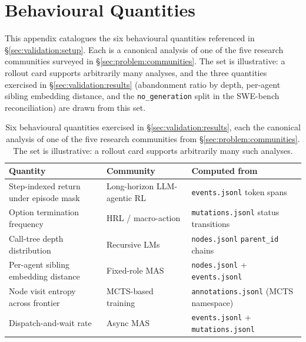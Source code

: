 \documentclass{article}
\begin{document}

\section{Behavioural Quantities}
\label{app:quantities}

This appendix catalogues the six behavioural quantities
referenced in \S\ref{sec:validation:setup}. Each is a
canonical analysis of one of the five research communities
surveyed in \S\ref{sec:problem:communities}. The set is
illustrative: a rollout card supports arbitrarily many
analyses, and the three quantities exercised in
\S\ref{sec:validation:results} (abandonment ratio by depth,
per-agent sibling embedding distance, and the
\texttt{no\_generation} split in the SWE-bench reconciliation)
are drawn from this set.

\begin{table}[h]
\centering
\small
\caption{Six behavioural quantities exercised in
\S\ref{sec:validation:results}, each the canonical analysis of
one of the five research communities from
\S\ref{sec:problem:communities}. The set is illustrative: a
rollout card supports arbitrarily many such analyses.}
\label{tab:quantities}
\begin{tabular}{@{}p{}p{}p{}@{}}
\toprule
\textbf{Quantity} & \textbf{Community} & \textbf{Computed from} \\
\midrule
Step-indexed return under episode mask & Long-horizon LLM-agentic RL \citep{chen2025loop, wang2025ragen} & \texttt{events.jsonl} token spans \\
Option termination frequency & HRL / macro-action \citep{bacon2017optioncritic} & \texttt{mutations.jsonl} status transitions \\
Call-tree depth distribution & Recursive LMs \citep{zhu2024redel} & \texttt{nodes.jsonl} \texttt{parent\_id} chains \\
Per-agent sibling embedding distance & Fixed-role MAS \citep{cemri2025mast} & \texttt{nodes.jsonl} + \texttt{events.jsonl} \\
Node visit entropy across frontier & MCTS-based training \citep{rstarmath2025, feng2024restmcts} & \texttt{annotations.jsonl} (MCTS namespace) \\
Dispatch-and-wait rate & Async MAS & \texttt{events.jsonl} + \texttt{mutations.jsonl} \\
\bottomrule
\end{tabular}
\end{table}
\end{document}
